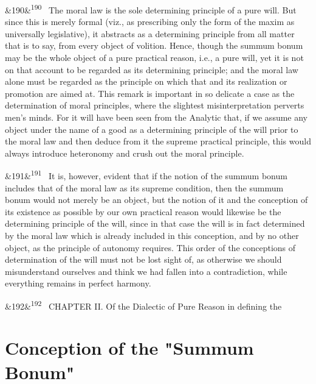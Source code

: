 \documentclass[12pt]{article}
\newcommand{\para}[1][]{\par\noindent\ifx&#1&\else\textsuperscript{\footnotesize #1}~\fi}
\begin{document}
\para[190] The moral law is the sole determining principle of a pure will. But since this is merely formal (viz., as prescribing only the form of the maxim as universally legislative), it abstracts as a determining principle from all matter that is to say, from every object of volition. Hence, though the summum bonum may be the whole object of a pure practical reason, i.e., a pure will, yet it is not on that account to be regarded as its determining principle; and the moral law alone must be regarded as the principle on which that and its realization or promotion are aimed at. This remark is important in so delicate a case as the determination of moral principles, where the slightest misinterpretation perverts men's minds. For it will have been seen from the Analytic that, if we assume any object under the name of a good as a determining principle of the will prior to the moral law and then deduce from it the supreme practical principle, this would always introduce heteronomy and crush out the moral principle.

\para[191] It is, however, evident that if the notion of the summum bonum includes that of the moral law as its supreme condition, then the summum bonum would not merely be an object, but the notion of it and the conception of its existence as possible by our own practical reason would likewise be the determining principle of the will, since in that case the will is in fact determined by the moral law which is already included in this conception, and by no other object, as the principle of autonomy requires. This order of the conceptions of determination of the will must not be lost sight of, as otherwise we should misunderstand ourselves and think we had fallen into a contradiction, while everything remains in perfect harmony.

\para[192] CHAPTER II. Of the Dialectic of Pure Reason in defining the

\section*{Conception of the "Summum Bonum"}
\end{document}
